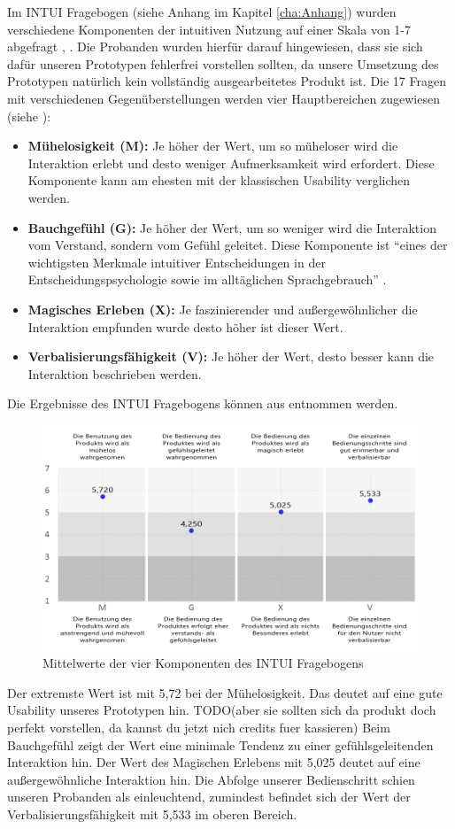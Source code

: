 Im INTUI Fragebogen (siehe Anhang im Kapitel \ref{cha:Anhang}) wurden verschiedene Komponenten der intuitiven Nutzung auf einer Skala von 1-7 abgefragt \citep{diefenbach2010handbuch}, \citep{ullrich2010intui}.
Die Probanden wurden hierfür darauf hingewiesen, dass sie sich dafür unseren Prototypen fehlerfrei vorstellen sollten, da unsere Umsetzung des Prototypen natürlich kein vollständig ausgearbeitetes Produkt ist.  
Die 17 Fragen mit verschiedenen Gegenüberstellungen werden vier Hauptbereichen zugewiesen (siehe \citep[Seite 24]{diefenbach2010handbuch}):
\begin{itemize}
\item \textbf{Mühelosigkeit (M):} Je höher der Wert, um so müheloser wird die Interaktion erlebt und desto weniger Aufmerksamkeit wird erfordert. Diese Komponente kann am ehesten mit der klassischen Usability verglichen werden.
\item \textbf{Bauchgefühl (G):} Je höher der Wert, um so weniger wird die Interaktion vom Verstand, sondern vom Gefühl geleitet. Diese Komponente ist "`eines der wichtigsten Merkmale intuitiver Entscheidungen in der Entscheidungspsychologie sowie im alltäglichen Sprachgebrauch"' \citep[Seite 24]{diefenbach2010handbuch}.
\item \textbf{Magisches Erleben (X):} Je faszinierender und außergewöhnlicher die Interaktion empfunden wurde desto höher ist dieser Wert. 
\item \textbf{Verbalisierungsfähigkeit (V):} Je höher der Wert, desto besser kann die Interaktion beschrieben werden. 
\end{itemize}
Die Ergebnisse des INTUI Fragebogens können aus  entnommen werden.
\begin{figure}[ht]
	\centering
		\includegraphics[width=1\textwidth]{img/INTUI_Grafik.jpg}
	\caption{Mittelwerte der vier Komponenten des INTUI Fragebogens}
	\label{fig:INTUI}
\end{figure}
Der extremste Wert ist mit 5,72 bei der Mühelosigkeit.
Das deutet auf eine gute Usability unseres Prototypen hin. TODO(aber sie sollten sich da produkt doch perfekt vorstellen, da kannst du jetzt nich credits fuer kassieren)
Beim Bauchgefühl zeigt der Wert eine minimale Tendenz zu einer gefühlsgeleitenden Interaktion hin. 
Der Wert des Magischen Erlebens mit 5,025 deutet auf eine außergewöhnliche Interaktion hin.
Die Abfolge unserer Bedienschritt schien unseren Probanden als einleuchtend, zumindest befindet sich der Wert der Verbalisierungsfähigkeit mit 5,533 im oberen Bereich.

